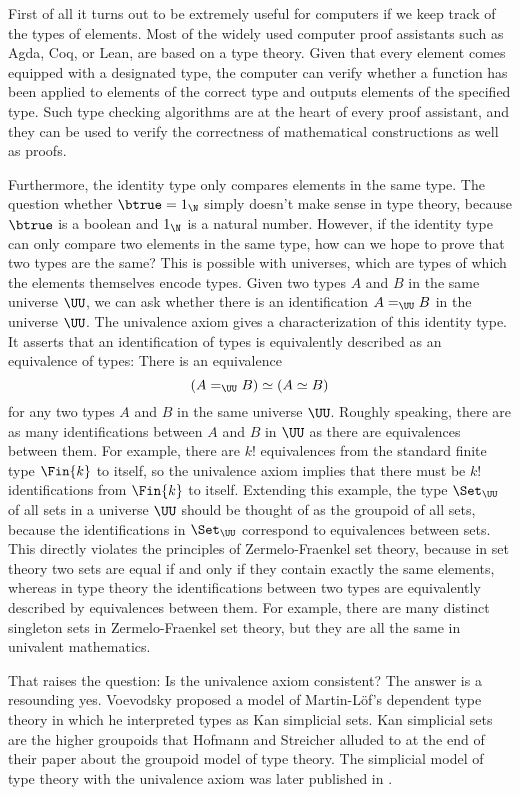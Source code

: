 First of all it turns out to be extremely useful for computers if we keep track of the types of elements. Most of the widely used computer proof assistants such as Agda, Coq, or Lean, are based on a type theory. Given that every element comes equipped with a designated type, the computer can verify whether a function has been applied to elements of the correct type and outputs elements of the specified type. Such type checking algorithms are at the heart of every proof assistant, and they can be used to verify the correctness of mathematical constructions as well as proofs.

Furthermore, the identity type only compares elements in the same type. The question whether $\btrue=1_\N$ simply doesn't make sense in type theory, because $\btrue$ is a boolean and $1_\N$ is a natural number. However, if the identity type can only compare two elements in the same type, how can we hope to prove that two types are the same? This is possible with universes, which are types of which the elements themselves encode types. Given two types $A$ and $B$ in the same universe $\UU$, we can ask whether there is an identification $A=_\UU B$ in the universe $\UU$. The univalence axiom gives a characterization of this identity type. It asserts that an identification of types is equivalently described as an equivalence of types: There is an equivalence
\begin{equation*}
  (A=_\UU B) \simeq (A\simeq B)
\end{equation*}
for any two types $A$ and $B$ in the same universe $\UU$. Roughly speaking, there are as many identifications between $A$ and $B$ in $\UU$ as there are equivalences between them. For example, there are $k!$ equivalences from the standard finite type $\Fin{k}$ to itself, so the univalence axiom implies that there must be $k!$ identifications from $\Fin{k}$ to itself. Extending this example, the type $\Set_\UU$ of all sets in a universe $\UU$ should be thought of as the groupoid of all sets, because the identifications in $\Set_\UU$ correspond to equivalences between sets. This directly violates the principles of Zermelo-Fraenkel set theory, because in set theory two sets are equal if and only if they contain exactly the same elements, whereas in type theory the identifications between two types are equivalently described by equivalences between them. For example, there are many distinct singleton sets in Zermelo-Fraenkel set theory, but they are all the same in univalent mathematics.

That raises the question: Is the univalence axiom consistent? The answer is a resounding yes. Voevodsky proposed a model of Martin-L\"of's dependent type theory in which he interpreted types as Kan simplicial sets. Kan simplicial sets are the higher groupoids that Hofmann and Streicher alluded to at the end of their paper about the groupoid model of type theory. The simplicial model of type theory with the univalence axiom was later published in \cite{KapulkinLeFanuLumsdaine}.

